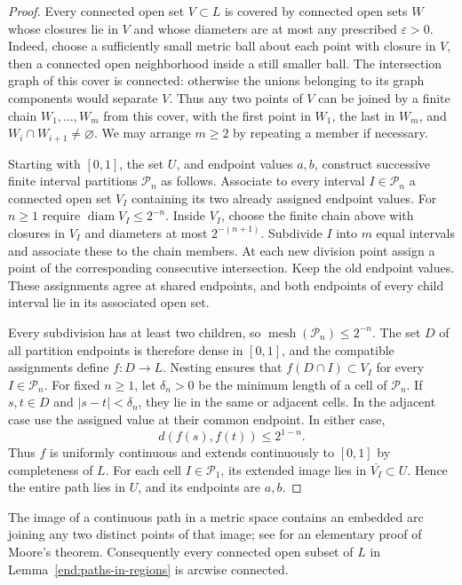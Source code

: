 \begin{proof}
Every connected open set $V\subset L$ is covered by connected open
sets $W$ whose closures lie in $V$ and whose diameters are at most any
prescribed $\varepsilon>0$. Indeed, choose a sufficiently small metric
ball about each point with closure in $V$, then a connected open
neighborhood inside a still smaller ball. The intersection graph of
this cover is connected: otherwise the unions belonging to its graph
components would separate $V$. Thus any two points of $V$ can be
joined by a finite chain $W_1,\ldots,W_m$ from this cover, with the
first point in $W_1$, the last in $W_m$, and
$W_i\cap W_{i+1}\ne\varnothing$. We may arrange $m\ge2$ by repeating
a member if necessary.

Starting with $[0,1]$, the set $U$, and endpoint values $a,b$, construct
successive finite interval partitions $\mathcal P_n$ as follows.
Associate to every interval $I\in\mathcal P_n$ a connected open set
$V_I$ containing its two already assigned endpoint values. For $n\ge1$
require $\operatorname{diam}V_I\le2^{-n}$. Inside $V_I$, choose the
finite chain above with closures in $V_I$ and diameters at most
$2^{-(n+1)}$. Subdivide $I$ into $m$ equal intervals and associate these
to the chain members. At each new division point assign a point of
the corresponding consecutive intersection. Keep the old endpoint
values. These assignments agree at shared endpoints, and both
endpoints of every child interval lie in its associated open set.

Every subdivision has at least two children, so
$\operatorname{mesh}(\mathcal P_n)\le2^{-n}$. The set $D$ of all
partition endpoints is therefore dense in $[0,1]$, and the compatible
assignments define $f:D\to L$. Nesting ensures that
$f(D\cap I)\subset V_I$ for every $I\in\mathcal P_n$.
For fixed $n\ge1$, let $\delta_n>0$ be the minimum length of a cell
of $\mathcal P_n$. If $s,t\in D$ and $|s-t|<\delta_n$, they lie in
the same or adjacent cells. In the adjacent case use the assigned
value at their common endpoint. In either case,
\[
 d(f(s),f(t))\le2^{1-n}.
\]
Thus $f$ is uniformly continuous and extends continuously to $[0,1]$
by completeness of $L$. For each cell $I\in\mathcal P_1$, its extended
image lies in $\overline{V_I}\subset U$. Hence the entire path lies in
$U$, and its endpoints are $a,b$.
\end{proof}

The image of a continuous path in a metric space contains an embedded
arc joining any two distinct points of that image; see
\cite[pp.~301--304]{Kamiya1930} for an elementary proof of Moore's
theorem. Consequently every connected open subset of $L$ in
Lemma~\ref{end:paths-in-regions} is arcwise connected.

